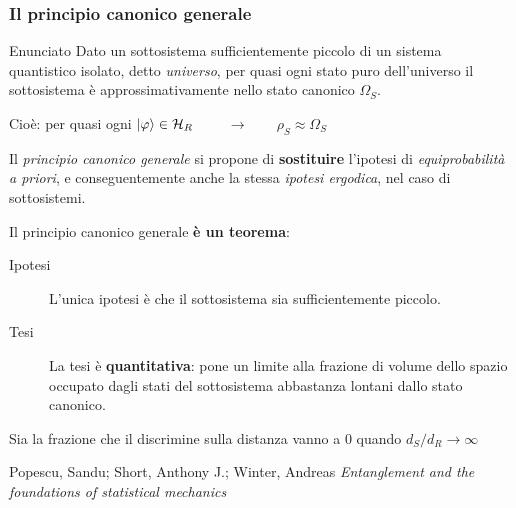 \documentclass[10pt]{beamer}	%
\theoremstyle{definition}
\theoremstyle{plain}
\begin{document}
\begin{frame}
	\frametitle{Il principio canonico generale}
	
	\begin{block}{Enunciato}
		Dato un sottosistema sufficientemente piccolo di un sistema quantistico isolato, detto \textit{universo}, per quasi ogni stato puro dell'universo il sottosistema è approssimativamente nello stato canonico $\Omega_S$.
		
		\qquad Cioè: per quasi ogni $\ket{\varphi} \in \mathcal{H}_R$ $\qquad \rightarrow \qquad \rho_S \approx \Omega_S$
		
	\end{block}
	\pause
	
	Il \textit{principio canonico generale} si propone di \textbf{sostituire} l'ipotesi di \textit{equiprobabilità a priori}, e conseguentemente anche la stessa \textit{ipotesi ergodica}, nel caso di sottosistemi.
	\newline
	
	\pause
	\vspace*{-5pt}
	Il principio canonico generale \textbf{è un teorema}:
	\vspace*{-5pt}
	\begin{block}{}
		\begin{description}
			\item[Ipotesi] L'unica ipotesi è che il sottosistema sia sufficientemente piccolo.
			\item[Tesi] La tesi è \textbf{quantitativa}: pone un limite alla frazione di volume dello spazio occupato dagli stati del sottosistema abbastanza lontani dallo stato canonico.
		\end{description}
	\end{block}
	\vspace*{-3pt}
	\pause
	Sia la frazione che il discrimine sulla distanza vanno a $ 0 $ quando $ d_S / d_R \rightarrow \infty$
	\vspace*{-4pt}
	\begin{thebibliography}{9}
		Popescu, Sandu; Short, Anthony J.; Winter, Andreas
		\newblock \emph{Entanglement and the foundations of statistical mechanics}
	\end{thebibliography}
\end{frame}
\end{document}
